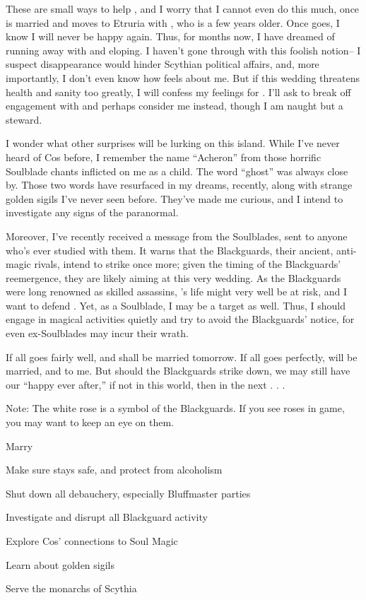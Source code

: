 \documentclass[char]{Kos}
\begin{document}
These are small ways to help \cBride{}, and I worry that I cannot even do this much, once \cBride{\they} is married and moves to Etruria with \cGroom{}, who is a few years older. Once \cBride{\they} goes, I know I will never be happy again. Thus, for months now, I have dreamed of running away with \cBride{} and eloping. I haven't gone through with this foolish notion-- I suspect \cBride{\their} disappearance would hinder Scythian political affairs, and, more importantly, I don't even know how \cBride{} feels about me. But if this wedding threatens \cBride{\their} health and sanity too greatly, I will confess my feelings for \cBride{\them}. I'll ask \cBride{\them} to break off \cBride{\their} engagement with \cGroom{} and perhaps consider me instead, though I am naught but a steward. 

I wonder what other surprises will be lurking on this island. While I've never heard of Cos before, I remember the name ``Acheron'' from those horrific Soulblade chants inflicted on me as a child. The word ``ghost'' was always close by. Those two words have resurfaced in my dreams, recently, along with strange golden sigils I've never seen before. They've made me curious, and I intend to investigate any signs of the paranormal.

Moreover, I've recently received a message from the Soulblades, sent to anyone who's ever studied with them. It warns that the Blackguards, their ancient, anti-magic rivals, intend to strike once more; given the timing of the Blackguards' reemergence, they are likely aiming at this very wedding. As the Blackguards were long renowned as skilled assassins, \cBride{}'s life might very well be at risk, and I want to defend \cBride{\them}. Yet, as a Soulblade, I may be a target as well. Thus, I should engage in magical activities quietly and try to avoid the Blackguards' notice, for even ex-Soulblades may incur their wrath.

If all goes fairly well, \cBride{} and \cGroom{} shall be married tomorrow. If all goes perfectly, \cBride{} will be married, and to me. But should the Blackguards strike \cBride{\them} down, we may still have our ``happy ever after,'' if not in this world, then in the next . . .

Note: The white rose is a symbol of the Blackguards. If you see roses in game, you may want to keep an eye on them.

\begin{itemz}[Goals]
 \item Marry \cBride{}
 \item Make sure \cBride{} stays safe, and protect \cBride{\them} from alcoholism
 \item Shut down all debauchery, especially Bluffmaster parties
 \item Investigate and disrupt all Blackguard activity
 \item Explore Cos' connections to Soul Magic
 \item Learn about golden sigils
 \item Serve the monarchs of Scythia
\end{itemz}
\end{document}
